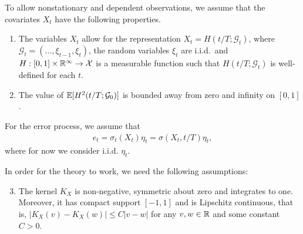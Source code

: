 \documentclass[a4paper,12pt]{article}
\begin{document}
To allow nonstationary and dependent observations, we assume that the covariates $X_t$ have the following properties. 
\begin{enumerate}[label=(C\arabic*),leftmargin=1.05cm]
\item \label{C-reg1} The variables $X_{t}$ allow for the representation $X_{t} = H(t/T; \mathcal{G}_{t})$, where $\mathcal{G}_{t} = (\ldots, \xi_{t-1}, \xi_{t})$, the random variables $\xi_{t}$ are i.i.d.\ and $H: [0, 1] \times \mathbb{R}^\infty \rightarrow \mathcal{X}$ is a measurable function such that $H(t/T; \mathcal{G}_{t})$ is well-defined for each $t$.%
\item \label{C-reg2} The value of $\mathbb{E}[H^2 (t/T; \mathcal{G}_{0})]$ is bounded away from zero and infinity on $[0, 1]$.
\end{enumerate}



For the error process, we assume that
\begin{align*}
e_t = \sigma_t(X_t)\eta_t = \sigma(X_t, t/T) \eta_t,
\end{align*}
where for now we consider i.i.d. $\eta_t$.


In order for the theory to work, we need the following assumptions:

\begin{enumerate}[label=(C\arabic*),leftmargin=1.05cm]
\setcounter{enumi}{2}
\item \label{C-kerX} The kernel $K_X$ is non-negative, symmetric about zero and integrates to one. Moreover, it has compact support $[-1,1]$ and is Lipschitz continuous, that is, $|K_X(v) - K_X(w)| \le C |v-w|$ for any $v,w \in \mathbb{R}$ and some constant $C > 0$. 
\end{enumerate} 
\end{document}
